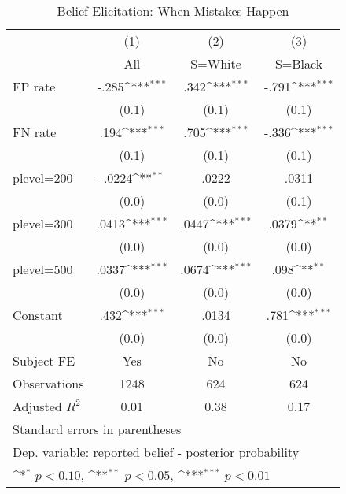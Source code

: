 \begin{table}[htbp]\centering
\def\sym#1{\ifmmode^{#1}\else\(^{#1}\)\fi}
\caption{Belief Elicitation: When Mistakes Happen}
\begin{tabular}{l*{3}{c}}
\hline\hline
                &\multicolumn{1}{c}{(1)}&\multicolumn{1}{c}{(2)}&\multicolumn{1}{c}{(3)}\\
                &\multicolumn{1}{c}{All}&\multicolumn{1}{c}{S=White}&\multicolumn{1}{c}{S=Black}\\
\hline
FP rate         &    -.285\sym{***}&     .342\sym{***}&    -.791\sym{***}\\
                &    (0.1)         &    (0.1)         &    (0.1)         \\
FN rate         &     .194\sym{***}&     .705\sym{***}&    -.336\sym{***}\\
                &    (0.1)         &    (0.1)         &    (0.1)         \\
plevel=200      &   -.0224\sym{**} &    .0222         &    .0311         \\
                &    (0.0)         &    (0.0)         &    (0.1)         \\
plevel=300      &    .0413\sym{***}&    .0447\sym{***}&    .0379\sym{**} \\
                &    (0.0)         &    (0.0)         &    (0.0)         \\
plevel=500      &    .0337\sym{***}&    .0674\sym{***}&     .098\sym{**} \\
                &    (0.0)         &    (0.0)         &    (0.0)         \\
Constant        &     .432\sym{***}&    .0134         &     .781\sym{***}\\
                &    (0.0)         &    (0.0)         &    (0.0)         \\
Subject FE      &      Yes         &       No         &       No         \\
\hline
Observations    &     1248         &      624         &      624         \\
Adjusted \(R^{2}\)&     0.01         &     0.38         &     0.17         \\
\hline\hline
\multicolumn{4}{l}{\footnotesize Standard errors in parentheses}\\
\multicolumn{4}{l}{\footnotesize Dep. variable: reported belief - posterior probability}\\
\multicolumn{4}{l}{\footnotesize \sym{*} \(p<0.10\), \sym{**} \(p<0.05\), \sym{***} \(p<0.01\)}\\
\end{tabular}
\end{table}
